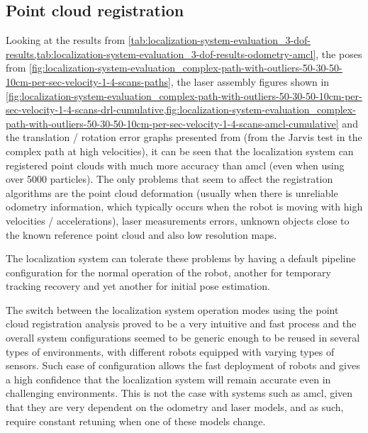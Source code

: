 \subsection{Point cloud registration}

Looking at the results from \cref{tab:localization-system-evaluation_3-dof-results,tab:localization-system-evaluation_3-dof-results-odometry-amcl}, the poses from \cref{fig:localization-system-evaluation_complex-path-with-outliers-50-30-50-10cm-per-sec-velocity-1-4-scans-paths}, the laser assembly figures shown in \cref{fig:localization-system-evaluation_complex-path-with-outliers-50-30-50-10cm-per-sec-velocity-1-4-scans-drl-cumulative,fig:localization-system-evaluation_complex-path-with-outliers-50-30-50-10cm-per-sec-velocity-1-4-scans-amcl-cumulative} and the translation / rotation error graphs presented from  (from the Jarvis test in the complex path at high velocities), it can be seen that the localization system can registered point clouds with much more accuracy than \gls{amcl} (even when using over 5000 particles). The only problems that seem to affect the registration algorithms are the point cloud deformation (usually when there is unreliable odometry information, which typically occurs when the robot is moving with high velocities / accelerations), laser measurements errors, unknown objects close to the known reference point cloud and also low resolution maps.

The localization system can tolerate these problems by having a default pipeline configuration for the normal operation of the robot, another for temporary tracking recovery and yet another for initial pose estimation.

The switch between the localization system operation modes using the point cloud registration analysis proved to be a very intuitive and fast process and the overall system configurations seemed to be generic enough to be reused in several types of environments, with different robots equipped with varying types of sensors. Such ease of configuration allows the fast deployment of robots and gives a high confidence that the localization system will remain accurate even in challenging environments. This is not the case with systems such as \gls{amcl}, given that they are very dependent on the odometry and laser models, and as such, require constant retuning when one of these models change.

